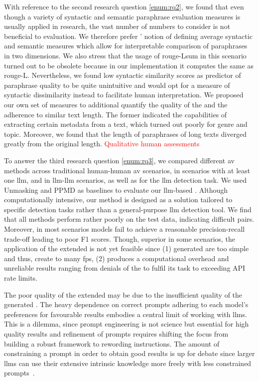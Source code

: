 With reference to the second research question \autoref{enum:rq2}, we found that even though a variety of syntactic and semantic paraphrase evaluation measures is usually applied in research, the vast number of numbers to consider is not beneficial to evaluation.
We therefore prefer \citet{gohsen_captions_2023}' notion of defining average syntactic and semantic measures which allow for interpretable comparison of paraphrases in two dimensions.
We also stress that the usage of \ac{rouge}-Lsum in this scenario turned out to be obsolete because in our implementation it computes the same as \ac{rouge}-L.
Nevertheless, we found low syntactic similarity scores as predictor of paraphrase quality to be quite unintuitive and would opt for a measure of syntactic dissimilarity instead to facilitate human interpretation.
We proposed our own set of measures to additional quantify the quality of the \pextractor and the adherence to similar text length.
The former indicated the capabilities of extracting certain metadata from a text, which turned out poorly for genre and topic. 
Moreover, we found that the length of paraphrases of long \dataGutenberg{} texts diverged greatly from the original length.
\textcolor{red}{Qualitative human assessments}

To answer the third research question \autoref{enum:rq3}, we compared different \ac{av} methods across traditional human-human \ac{av} scenarios, in scenarios with at least one \ac{llm}, and in \ac{llm}-\ac{llm} scenarios, as well as for the \ac{llm} detection task.
We used Unmasking and PPMD as baselines to evaluate our \ac{llm}-based \impAppr{}.
Although computationally intensive, our method is designed as a solution tailored to specific detection tasks  rather than a general-purpose \ac{llm} detection tool.
We find that all methods perform rather poorly on the test data, indicating difficult pairs.
Moreover, in most scenarios models fail to achieve a reasonable precision-recall trade-off leading to poor F1 scores.
Though, superior in some scenarios, the application of the extended \impAppr{} is not yet feasible since (1) generated \imps{} are too simple and thus, create to many \acp{fp}, (2) produces a computational overhead and unreliable results ranging from denials of the \pgenerator to fulfil its task to exceeding API rate limits.

The poor quality of the extended \impAppr{} may be due to the insufficient quality of the generated \imps{}.
The heavy dependence on correct prompts adhering to each model's preferences for favourable results embodies a central limit of working with \acp{llm}.
This is a dilemma, since prompt engineering is not science but essential for high quality results and refinement of prompts requires shifting the focus from building a robust framework to rewording instructions.
The amount of constraining a prompt in order to obtain good results is up for debate since larger \acp{llm} can use their extensive intrinsic knowledge more freely with less constrained prompts~\citep{schmidt_llm_av_latin_24}.

